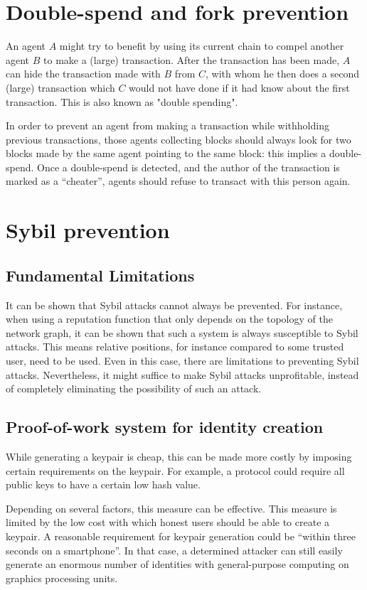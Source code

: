 \section{Double-spend and fork prevention}
An agent $A$ might try to benefit by using its current chain to compel another agent $B$ to make a (large) transaction. After the transaction has been made, $A$ can hide the transaction made with $B$ from $C$, with whom he then does a second (large) transaction which $C$ would not have done if it had know about the first transaction. This is also known as "double spending".

In order to prevent an agent from making a transaction while withholding previous transactions, those agents collecting blocks should always look for two blocks made by the same agent pointing to the same block: this implies a double-spend. Once a double-spend is detected, and the author of the transaction is marked as a ``cheater'', agents should refuse to transact with this person again.

\section{Sybil prevention}
\subsection{Fundamental Limitations}
It can be shown that Sybil attacks cannot always be prevented. 
For instance, when using a reputation function that only depends on the topology of the network graph, 
it can be shown that such a system is always susceptible to Sybil attacks. 
This means relative positions, 
for instance compared to some trusted user, 
need to be used. 
Even in this case, 
there are limitations to preventing Sybil attacks. 
Nevertheless, it might suffice to make Sybil attacks unprofitable, 
instead of completely eliminating the possibility of such an attack. 

\subsection{Proof-of-work system for identity creation}\label{sssection:chain_creation_cost}
While generating a keypair is cheap, this can be made more costly by imposing certain requirements on the keypair. For example, a protocol could require all public keys to have a certain low hash value.

Depending on several factors, this measure can be effective. This measure is limited by the low cost with which honest users should be able to create a keypair. A reasonable requirement for keypair generation could be ``within three seconds on a smartphone''. In that case, a determined attacker can still easily generate an enormous number of identities with general-purpose computing on graphics processing units.

